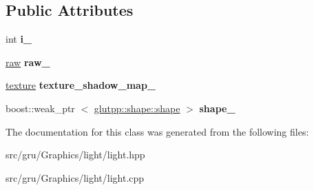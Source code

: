 \subsection*{\-Public \-Attributes}
\begin{DoxyCompactItemize}
\item 
\hypertarget{classglutpp_1_1light_1_1light_afa7e0890ce66350d6adad22282ec4a19}{int {\bfseries i\-\_\-}}\label{classglutpp_1_1light_1_1light_afa7e0890ce66350d6adad22282ec4a19}

\item 
\hypertarget{classglutpp_1_1light_1_1light_ac919169305f5dc46e47073308b1d26e1}{\hyperlink{classglutpp_1_1light_1_1raw}{raw} {\bfseries raw\-\_\-}}\label{classglutpp_1_1light_1_1light_ac919169305f5dc46e47073308b1d26e1}

\item 
\hypertarget{classglutpp_1_1light_1_1light_a514b6b13118418366398118bb47291be}{\hyperlink{classglutpp_1_1texture}{texture} {\bfseries texture\-\_\-shadow\-\_\-map\-\_\-}}\label{classglutpp_1_1light_1_1light_a514b6b13118418366398118bb47291be}

\item 
\hypertarget{classglutpp_1_1light_1_1light_a3f692ac7113fd04fe4ffef57e2e5a9a1}{boost\-::weak\-\_\-ptr\*
$<$ \hyperlink{classglutpp_1_1shape_1_1shape}{glutpp\-::shape\-::shape} $>$ {\bfseries shape\-\_\-}}\label{classglutpp_1_1light_1_1light_a3f692ac7113fd04fe4ffef57e2e5a9a1}

\end{DoxyCompactItemize}


\-The documentation for this class was generated from the following files\-:\begin{DoxyCompactItemize}
\item 
src/gru/\-Graphics/light/light.\-hpp\item 
src/gru/\-Graphics/light/light.\-cpp\end{DoxyCompactItemize}
